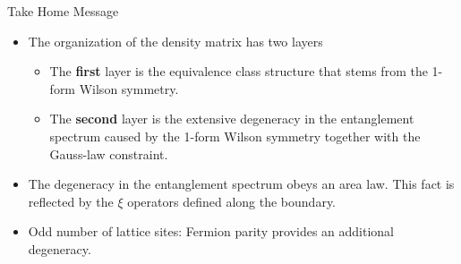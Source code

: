 \documentclass[professionalfont,
                xcolor=dvipsnames]{beamer}
\begin{document}
\begin{frame}{Take Home Message}
    \begin{itemize}
        \item The organization of the density matrix has two layers
        \begin{itemize}
            \item The \textbf{first} layer is the equivalence class structure that stems from the 1-form Wilson symmetry.
            \item The \textbf{second} layer is the extensive degeneracy in the entanglement spectrum caused by the 1-form Wilson symmetry together with the Gauss-law constraint.
        \end{itemize}

        \item The degeneracy in the entanglement spectrum obeys an area law. This fact is reflected by the $\xi$ operators defined along the boundary.

        \item Odd number of lattice sites: Fermion parity provides an additional degeneracy.
    \end{itemize}
\end{frame}
\end{document}
